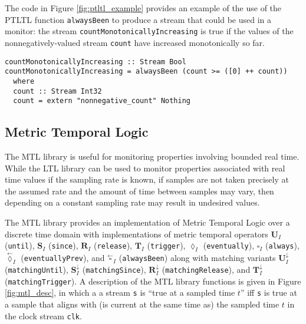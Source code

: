 The code in Figure \ref{fig:ptltl_example} provides an example of the use of the PTLTL function
\verb,alwaysBeen, to produce a stream that could be used in a monitor:
the stream \verb,countMonotonicallyIncreasing, is true if the values of the
nonnegatively-valued stream \verb,count, have increased monotonically so far.

\begin{figure*}[!htb]
\begin{lstlisting}[frame=none]
countMonotonicallyIncreasing :: Stream Bool
countMonotonicallyIncreasing = alwaysBeen (count >= ([0] ++ count))
  where
  count :: Stream Int32
  count = extern "nonnegative_count" Nothing
\end{lstlisting}
\caption{An example use of a PLTL library function.}
\label{fig:ptltl_example}
\end{figure*}

\subsection{Metric Temporal Logic}
The MTL library is useful for monitoring properties involving
bounded real time.
While the LTL library can be used to monitor properties
associated with real time values if the sampling rate is known, if
samples are not taken precisely at the assumed rate and the amount
of time between samples may vary, then depending on a constant
sampling rate may result in undesired values.

The MTL library provides an implementation of Metric Temporal Logic over a discrete time domain
with implementations of metric temporal operators
$\mathbf{U}_{I}$ (\verb,until,), $\mathbf{S}_{I}$ (\verb,since,), $\mathbf{R}_{I}$ (\verb,release,),
$\mathbf{T}_{I}$ (\verb,trigger,), $\lozenge_{I}$ (\verb,eventually,),
$\square_{I}$ (\verb,always,), $\overset{\leftarrow}{\lozenge}_{I}$ (\verb,eventuallyPrev,), and
$\overset{\leftarrow}{\square}_{I}$ (\verb,alwaysBeen,) along with matching variants
$\mathbf{U}^{\downarrow}_{I}$ (\verb,matchingUntil,),
$\mathbf{S}^{\downarrow}_{I}$ (\verb,matchingSince,),
$\mathbf{R}^{\downarrow}_{I}$ (\verb,matchingRelease,),
and $\mathbf{T}^{\downarrow}_{I}$ (\verb,matchingTrigger,).
A description of the MTL library functions is given in Figure
\ref{fig:mtl_desc}, in which a a stream \verb,s, is ``true at a sampled
time $t$'' iff \verb,s, is true at a sample that aligns with
(is current at the same time as) the
sampled time $t$ in the clock stream \verb,clk,.

